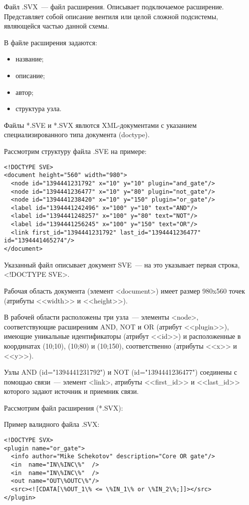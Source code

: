 Файл .SVX~--- файл расширения.
Описывает подключаемое расширение.
Представляет собой описание вентиля или целой сложной подсистемы, являющейся частью данной схемы.

В файле расширения задаются:
\begin{itemize}
  \item название;
  \item описание;
  \item автор;
  \item структура узла.
\end{itemize}

Файлы *.SVE и *.SVX явлются XML-документами с указанием специализированного типа документа (doctype).

Рассмотрим структуру файла .SVE на примере:
\begin{lstlisting}
<!DOCTYPE SVE>
<document height="560" width="980">
  <node id="1394441231792" x="10" y="10" plugin="and_gate"/>
  <node id="1394441236477" x="10" y="80" plugin="not_gate"/>
  <node id="1394441238420" x="10" y="150" plugin="or_gate"/>
  <label id="1394441242496" x="100" y="10" text="AND"/>
  <label id="1394441248257" x="100" y="80" text="NOT"/>
  <label id="1394441256245" x="100" y="150" text="OR"/>
  <link first_id="1394441231792" last_id="1394441236477" id="1394441465274"/>
</document>
\end{lstlisting}

Указанный файл описывает документ SVE~--- на это указывает первая строка, <!DOCTYPE SVE>.

Рабочая область документа (элемент <document>) имеет размер 980x560 точек (атрибуты <<width>> и <<height>>).

В рабочей области расположены три узла~--- элементы <node>, соответствующие расширениям AND, NOT и OR (атрибут <<plugin>>), имеющие уникальные идентификаторы (атрибут <<id>>) и расположенные в координатах (10;10), (10;80) и (10;150), соответственно (атрибуты <<x>> и <<y>>).

Узлы AND (id="1394441231792") и NOT (id="1394441236477") соединены с помощью связи~--- элемент <link>, атрибуты <<first\_id>> и <<last\_id>> которого задают источник и приемник связи.

Рассмотрим файл расширения (*.SVX):

Пример валидного файла .SVX:

\begin{lstlisting}
<!DOCTYPE SVX>
<plugin name="or_gate">
  <info author="Mike Schekotov" description="Core OR gate"/>
  <in  name="IN\%INC\%"  />
  <in  name="IN\%INC\%"  />
  <out name="OUT\%OUTC\%"/>
  <src><![CDATA[\%OUT_1\% <= \%IN_1\% or \%IN_2\%;]]></src>
</plugin>
\end{lstlisting}

